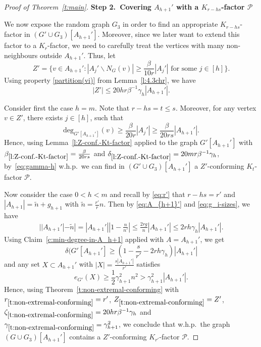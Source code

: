 \documentclass[reqno, 12pt]{amsart}
\numberwithin{equation}{section}
\numberwithin{figure}{section}
\theoremstyle{plain}
\theoremstyle{definition}
\def\cP{{\mathcal P}}
\let\setminus=\smallsetminus
\begin{document}
\begin{proof}[Proof of Theorem~\ref{t:main}]
    \smallskip

    {\bf Step 2.~Covering $A_{h+1}'$ with a $K_{r-hs}$-factor $\cP$}

    \smallskip
    
    We now expose the random graph $G_3$ in order to find an appropriate $K_{r-hs}$-factor in $(G'\cup G_3)[A_{h+1}']$. Moreover, since we later want to extend this factor to a $K_r$-factor, we need to carefully treat the vertices with many non-neighbours outside $A_{h+1}'$. Thus, let 
    \[Z' = \{v \in A_{h+1}': |A_j' \setminus N_G(v)| \geq \frac{\beta}{10r}|A_j'| \text{ for some } j\in[h]\}.\] 
    Using property \ref{partition(vi)} from Lemma~\ref{l:4.3chr}, we have 
    \[ |Z'| \leq 20hr \beta^{-1} \gamma_h |A_{h+1}'| .\] 

    Consider first the case $h=m$. Note that $r-hs=t \leq s$. Moreover, for any vertex $v\in Z'$, there exists $j\in[h]$, such that 
    \[ \text{deg}_{G'[A_{h+1}']}(v) \geq \frac{\beta}{20r}|A_j'| \geq \frac{\beta}{20rs}|A_{h+1}'|.\] 
    Hence, using Lemma~\ref{l:Z-conf.-Kt-factor} applied to the graph $G'[A_{h+1}']$ with $\beta_{\ref{l:Z-conf.-Kt-factor}}=\frac{\beta}{20rs}$ and $\delta_{\ref{l:Z-conf.-Kt-factor}}=20mr\beta^{-1}\gamma_h$, by~\eqref{eq:gamma-h} w.h.p.~we can find in $(G'\cup G_3)[A_{h+1}']$ a $Z'$-conforming $K_t$-factor $\cP$.

    \smallskip
    
    Now consider the case $0<h<m$ and recall by \eqref{eq:r'} that $r-hs = r'$ and $|A_{h+1}|=\tilde{n}+g_{h+1}$ with $\tilde{n}=\frac{r'}{r}n$. Then by \eqref{eq:A_{h+1}'} and \eqref{eq:g_i-sizes}, we have
    \begin{align*} 
        ||A_{h+1}'|-\tilde{n}| = |A_{h+1}'|\left|1- \frac{n}{n'}\right| \leq \frac{2rg}{n}|A_{h+1}'| \leq 2rh\gamma_h |A_{h+1}'|.
    \end{align*}
     Using Claim~\ref{c:min-degree-in-A_h+1} applied with $A=A_{h+1}'$, we get
    \[\delta(G'[A_{h+1}'] \geq \left(1-\frac{s}{r'}-2rh\gamma_h\right)|A_{h+1}'|\] 
    and any set $X\subset A_{h+1}'$ with $|X|=\frac{s|A_{h+1}'|}{r'}$ satisfies 
    \[e_{G'}(X) \geq \frac12\gamma_{h+1}^2n^2 > \gamma_{h+1}^2|A_{h+1}'|.\] 
    Hence, using Theorem~\ref{t:non-extremal-conforming} with $r_{\ref{t:non-extremal-conforming}}=r'$, $Z_{\ref{t:non-extremal-conforming}}=Z'$, $\zeta_{\ref{t:non-extremal-conforming}}=20hr\beta^{-1}\gamma_h$ and $\gamma_{\ref{t:non-extremal-conforming}} = \gamma_{h+1}^2$, we conclude that w.h.p.~the graph $(G \cup G_3)[A_{h+1}']$ contains a $Z'$-conforming $K_{r'}$-factor $\mathcal{P}$.


\end{proof}
\end{document}
